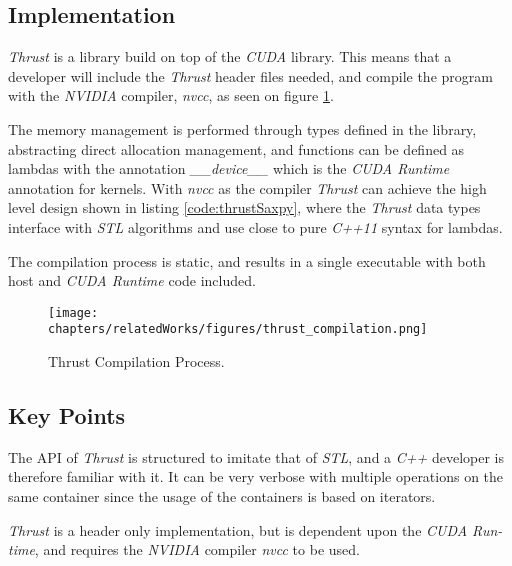 \subsection{Implementation}
\textit{Thrust} is a library build on top of the \textit{CUDA} library. This means that a developer will include the \textit{Thrust} header files needed, and compile the program with the \textit{NVIDIA} compiler, \textit{nvcc}, as seen on figure \ref{fig:thrustCompilation}. 

The memory management is performed through types defined in the library, abstracting direct allocation management, and functions can be defined as lambdas with the annotation \textit{\_\_device\_\_} which is the \textit{CUDA Runtime} annotation for kernels. With \textit{nvcc} as the compiler \textit{Thrust} can achieve the high level design shown in listing \ref{code:thrustSaxpy}, where the \textit{Thrust} data types interface with \textit{STL} algorithms and use close to pure \textit{C++11} syntax for lambdas.

The compilation process is static, and results in a single executable with both host and \textit{CUDA Runtime} code included.
\begin{figure}[H]
\center
\texttt{[image: chapters/relatedWorks/figures/thrust\_compilation.png]}
\caption{Thrust Compilation Process.}
\label{fig:thrustCompilation}
\end{figure}

\subsection{Key Points}
The API of \textit{Thrust} is structured to imitate that of \textit{STL}, and a \textit{C++} developer is therefore familiar with it. It can be very verbose with multiple operations on the same container since the usage of the containers is based on iterators.

\textit{Thrust} is a header only implementation, but is dependent upon the \textit{CUDA Run-time}, and requires the \textit{NVIDIA} compiler \textit{nvcc} to be used.